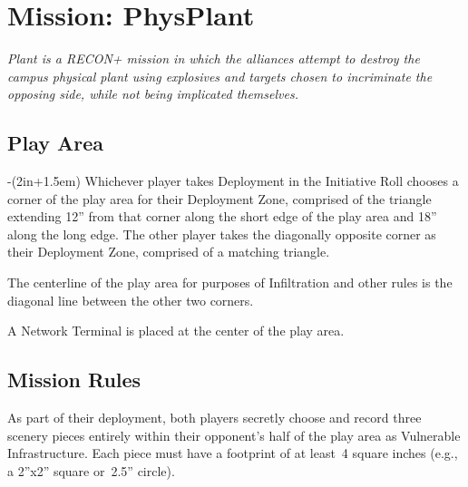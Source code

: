 \chapter{Mission: PhysPlant}

\emph{\emph{Plant} is a RECON+ mission in which the alliances attempt
  to destroy the campus physical plant using explosives and targets
  chosen to incriminate the opposing side, while not being implicated
  themselves.}

\section{Play Area}
\vspace{-2\parskip}
\noindent\begin{stdminipage}{\linewidth-(2in+1.5em)}
\vspace{0pt}   
\noindent
Whichever player takes Deployment in the Initiative Roll chooses a
corner of the play area for their Deployment Zone, comprised of the
triangle extending 12'' from that corner along the short edge of the
play area and 18'' along the long edge.  The other player takes the
diagonally opposite corner as their Deployment Zone, comprised of a
matching triangle.

The centerline of the play area for purposes of Infiltration and other
rules is the diagonal line between the other two corners.

A Network Terminal is placed at the center of the play area.

\section{Mission Rules}
As part of their deployment, both players secretly choose and record
three scenery pieces entirely within their opponent's half of the play
area as Vulnerable Infrastructure.  Each piece must have a footprint
of at least~4 square inches (e.g., a 2''x2'' square or~2.5'' circle).

\end{stdminipage}
\hfill
